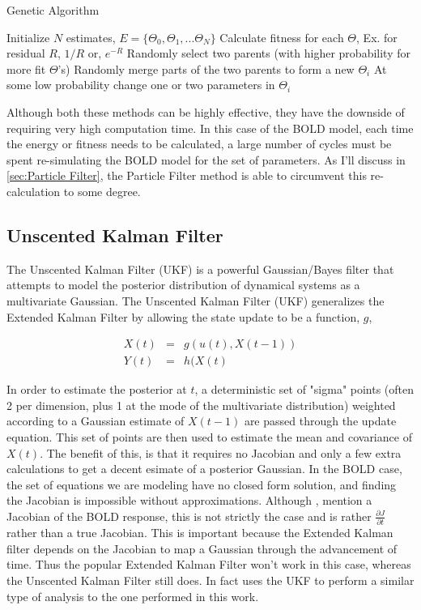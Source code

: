 
\begin{algorithm}
\caption{Genetic Algorithm}
\label{alg:Genetic Algorithm}
\begin{algorithmic}
\STATE Initialize $N$ estimates, $E = \{\Theta_0, \Theta_1, ... \Theta_N\}$
    \STATE Calculate fitness for each $\Theta$, Ex. for residual $R$, $1/R$ or, $e^{-R}$
        \STATE Randomly select two parents (with higher probability for more fit $\Theta$'s)
        \STATE Randomly merge parts of the two parents to form a new $\Theta_i$
        \STATE At some low probability change one or two parameters in $\Theta_i$
    \ENDFOR
\ENDFOR
\end{algorithmic}
\end{algorithm}

Although both these methods can be highly effective, they have the downside of
requiring very high computation time. In this case of the BOLD model,
each time the energy or fitness needs to be calculated, a large number of cycles
must be spent re-simulating the BOLD model for the set of parameters. As I'll
discuss in \autoref{sec:Particle Filter}, the Particle Filter method is able
to circumvent this re-calculation to some degree.

\subsection{Unscented Kalman Filter}
\label{sec:Unscented Kalman Filter}
The Unscented Kalman Filter (UKF) is a powerful Gaussian/Bayes filter that attempts
to model the posterior distribution of dynamical systems as a multivariate
Gaussian. The Unscented Kalman Filter (UKF) generalizes the Extended Kalman
Filter by allowing the state update to be a function, $g$,

\begin{eqnarray}
X(t) &=& g(u(t), X(t-1))\\
Y(t) &=& h(X(t)
\end{eqnarray}

In order to estimate the posterior at $t$, a deterministic set of "sigma" points 
(often 2 per dimension, plus 1 at the mode of the multivariate distribution)
weighted according to a Gaussian estimate of $X(t-1)$ are passed through
the update equation. This set of points are then used to estimate the 
mean and covariance of $X(t)$. The benefit of this, is that it requires
no Jacobian and only a few extra calculations to get a decent esimate of
a posterior Gaussian. In the BOLD case, the set of equations we are modeling have no 
closed form solution, and finding the Jacobian is impossible without approximations. Although 
\cite{Riera2004}, \cite{Hu2009} mention a Jacobian of the BOLD response, this is
not strictly the case and is rather $\frac{\partial J}{\partial t}$
rather than a true Jacobian.  This is important because the Extended
Kalman filter depends on the Jacobian to map a Gaussian through the 
advancement of time. Thus the popular Extended Kalman Filter won't work
in this case, whereas the Unscented Kalman Filter still does. In fact
\cite{Hu2009} uses the UKF to perform a similar type of analysis to
the one performed in this work. 

